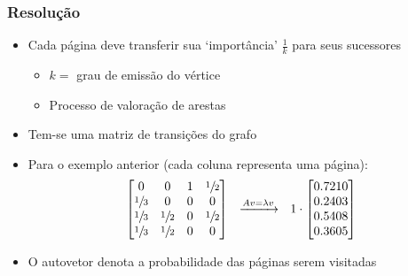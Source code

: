 \documentclass{beamer}
\begin{document}
\begin{frame}
    \frametitle{Resolução}
    \begin{itemize}
        \item Cada página deve transferir sua `importância' $\frac{1}{k}$ para
            seus sucessores
        \begin{itemize}
            \item $k =$ grau de emissão do vértice
            \item Processo de valoração de arestas
        \end{itemize}
        \item Tem-se uma matriz de transições do grafo
        \item Para o exemplo anterior (cada coluna representa uma página):
        \begin{equation*}
            \begin{bmatrix}
                0 & 0 & 1 & \sfrac{1}{2} \\
                \sfrac{1}{3} & 0 & 0 & 0 \\
                \sfrac{1}{3} & \sfrac{1}{2} & 0 & \sfrac{1}{2} \\
                \sfrac{1}{3} & \sfrac{1}{2} & 0 & 0
            \end{bmatrix} \ \
            \xrightarrow{Av = \lambda v} \ \
            1 \cdot
            \begin{bmatrix}
                0.7210 \\
                0.2403 \\
                0.5408 \\
                0.3605 \\
            \end{bmatrix}
        \end{equation*}
        \item O autovetor denota a probabilidade das páginas serem visitadas
    \end{itemize}
\end{frame}
\end{document}
